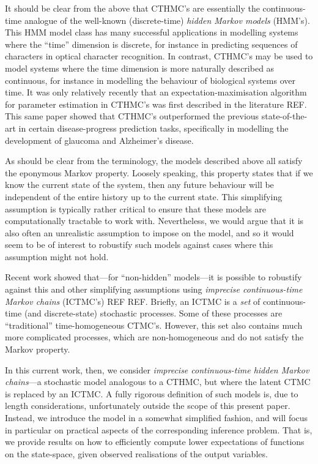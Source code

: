 \documentclass[twoside,11pt]{article}
\begin{document}
It should be clear from the above that CTHMC's are essentially the continuous-time analogue of the well-known (discrete-time) \emph{hidden Markov models} (HMM's). This HMM model class has many successful applications in modelling systems where the ``time'' dimension is discrete, for instance in predicting sequences of characters in optical character recognition. In contrast, CTHMC's may be used to model systems where the time dimension is more naturally described as continuous, for instance in modelling the behaviour of biological systems over time. It was only relatively recently that an expectation-maximisation algorithm for parameter estimation in CTHMC's was first described in the literature REF. This same paper showed that CTHMC's outperformed the previous state-of-the-art in certain disease-progress prediction tasks, specifically in modelling the development of glaucoma and Alzheimer's disease.

As should be clear from the terminology, the models described above all satisfy the eponymous Markov property. Loosely speaking, this property states that if we know the current state of the system, then any future behaviour will be independent of the entire history up to the current state. This simplifying assumption is typically rather critical to ensure that these models are computationally tractable to work with. Nevertheless, we would argue that it is also often an unrealistic assumption to impose on the model, and so it would seem to be of interest to robustify such models against cases where this assumption might not hold.

Recent work showed that---for ``non-hidden'' models---it is possible to robustify against this and other simplifying assumptions using \emph{imprecise continuous-time Markov chains} (ICTMC's) REF REF. Briefly, an ICTMC is a \emph{set} of continuous-time (and discrete-state) stochastic processes. Some of these processes are ``traditional'' time-homogeneous CTMC's. However, this set also contains much more complicated processes, which are non-homogeneous and do not satisfy the Markov property.

In this current work, then, we consider \emph{imprecise continuous-time hidden Markov chains}---a stochastic model analogous to a CTHMC, but where the latent CTMC is replaced by an ICTMC. A fully rigorous definition of such models is, due to length considerations, unfortunately outside the scope of this present paper. Instead, we introduce the model in a somewhat simplified fashion, and will focus in particular on practical aspects of the corresponding inference problem. That is, we provide results on how to efficiently compute lower expectations of functions on the state-space, given observed realisations of the output variables.
\end{document}

